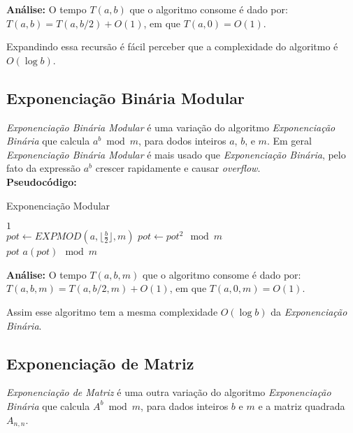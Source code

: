 \textbf{Análise:}
O tempo $T(a,b)$ que o algoritmo consome é dado por: $T(a,b) = T(a,b/2)+O(1)$, em que $T(a,0) = O(1)$.

Expandindo essa recursão é fácil perceber que a complexidade do algoritmo é $O(\log b)$.


\subsection{Exponenciação Binária Modular}

\textit{Exponenciação Binária Modular} é uma variação do algoritmo \textit{Exponenciação Binária} que calcula $a^b\bmod m$, para dodos inteiros $a$, $b$, e $m$. Em geral \textit{Exponenciação Binária Modular} é mais usado que \textit{Exponenciação Binária}, 
pelo fato da expressão $a^b$ crescer rapidamente e causar \textit{overflow}.\\

\textbf{Pseudocódigo:}
\begin{algorithm}
\caption{Exponenciação Modular}\label{exponenciacao_modular}
\begin{algorithmic}[1]
\State \Return $1$
\EndIf 
\\
\State $pot \gets EXPMOD(a, \lfloor \frac{b}{2} \rfloor, m)$
\State $pot \gets pot^2 \mod m$
\\
\State \Return $pot$
\Else
\State \Return $a(pot) \mod m$
\EndIf

\EndProcedure
\end{algorithmic}
\end{algorithm}


\textbf{Análise:}
O tempo $T(a,b,m)$ que o algoritmo consome é dado por: $T(a,b,m) = T(a,b/2,m)+O(1)$, em que $T(a,0,m) = O(1)$.

Assim esse algoritmo tem a mesma complexidade $O(\log b)$ da \textit{Exponenciação Binária}.

\subsection{Exponenciação de Matriz}

\textit{Exponenciação de Matriz} é uma outra variação do algoritmo \textit{Exponenciação Binária} que calcula $A^b\bmod m$, para dados inteiros $b$ e $m$ e a matriz quadrada $A_{n,n}$. 

